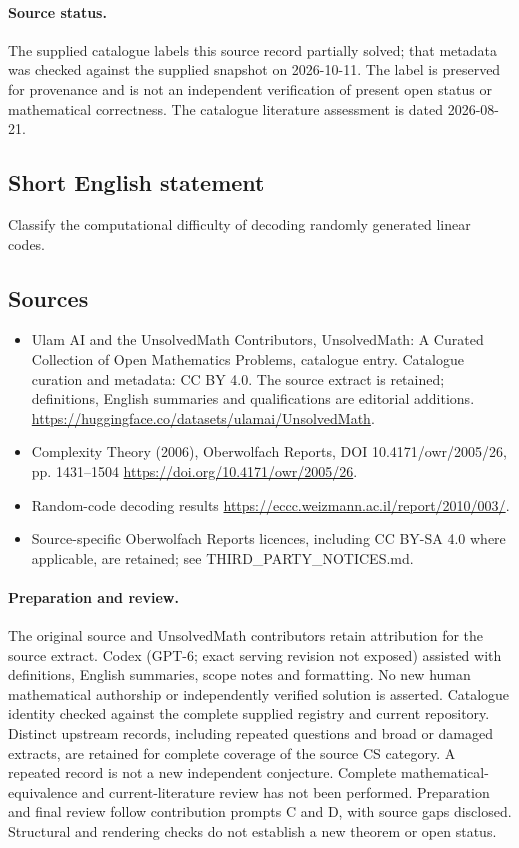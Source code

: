 \documentclass[11pt]{article}
\begin{document}
\paragraph{Source status.}
The supplied catalogue labels this source record partially solved; that metadata was checked against the supplied snapshot on 2026-10-11. The label is preserved for provenance and is not an independent verification of present open status or mathematical correctness. The catalogue literature assessment is dated 2026-08-21.
\subsection{Short English statement}
Classify the computational difficulty of decoding randomly generated linear codes.
\subsection{Sources}
\begin{itemize}
\item[S1] Ulam AI and the UnsolvedMath Contributors, UnsolvedMath: A Curated Collection of Open Mathematics Problems, catalogue entry. Catalogue curation and metadata: CC BY 4.0. The source extract is retained; definitions, English summaries and qualifications are editorial additions.
\url{https://huggingface.co/datasets/ulamai/UnsolvedMath}.
\item[S2] Complexity Theory (2006), Oberwolfach Reports, DOI 10.4171/owr/2005/26, pp. 1431--1504
\url{https://doi.org/10.4171/owr/2005/26}.
\item[S3] Random-code decoding results
\url{https://eccc.weizmann.ac.il/report/2010/003/}.
\item Source-specific Oberwolfach Reports licences, including CC BY-SA 4.0 where applicable, are retained; see THIRD\_PARTY\_NOTICES.md.
\end{itemize}
\paragraph{Preparation and review.}
The original source and UnsolvedMath contributors retain attribution for the source extract. Codex (GPT-6; exact serving revision not exposed) assisted with definitions, English summaries, scope notes and formatting. No new human mathematical authorship or independently verified solution is asserted. Catalogue identity checked against the complete supplied registry and current repository. Distinct upstream records, including repeated questions and broad or damaged extracts, are retained for complete coverage of the source CS category. A repeated record is not a new independent conjecture. Complete mathematical-equivalence and current-literature review has not been performed. Preparation and final review follow contribution prompts C and D, with source gaps disclosed. Structural and rendering checks do not establish a new theorem or open status.
\label{end:statement}
\end{document}
